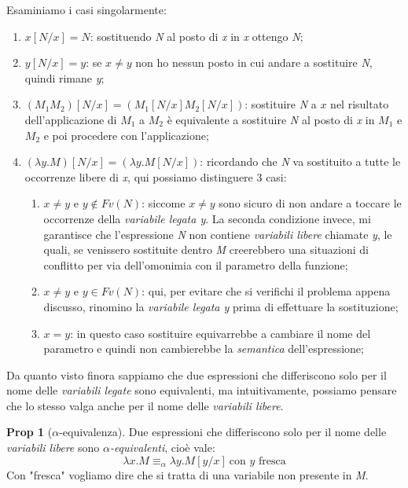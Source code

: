 \documentclass[12pt, a4paper]{report}
\theoremstyle{definition}
\newtheorem{proposition}{Prop}[section]
\newcommand{\aeq}{\equiv_\alpha}
\begin{document}
Esaminiamo i casi singolarmente:
\begin{enumerate}[label=(\roman*)]
    \item \(x[N/x]=N\): sostituendo \emph{N} al posto di \emph{x} in \emph{x}
    ottengo \emph{N};
    \item \(y[N/x]=y\): se $x\neq y$ non ho nessun posto in cui andare a sostituire
    \emph{N}, quindi rimane \emph{y};
    \item \((M_1M_2)[N/x]=(M_1[N/x]M_2[N/x])\): sostituire \emph{N} a $x$ nel risultato
    dell'applicazione di $M_1$ a $M_2$ è equivalente a sostituire \emph{N} al
    posto di \emph{x} in $M_1$ e $M_2$ e poi procedere con l'applicazione;
    \item \((\lambda y.M)[N/x]=(\lambda y.M[N/x])\): ricordando che \emph{N} va
    sostituito a tutte le occorrenze libere di \emph{x}, qui possiamo distinguere
    3 casi:
    \begin{enumerate}
        \item \(x\neq y\) e \(y\notin Fv(N)\): siccome $x\neq y$ sono sicuro di
        non andare a toccare le occorrenze della \emph{variabile legata y}. La
        seconda condizione invece, mi garantisce che l'espressione \emph{N} non
        contiene \emph{variabili libere} chiamate \emph{y}, le quali, se venissero
        sostituite dentro \emph{M} creerebbero una situazioni di conflitto per
        via dell'omonimia con il parametro della funzione;
        \item \(x\neq y\) e \(y\in Fv(N)\): qui, per evitare che si verifichi il
        problema appena discusso, rinomino la \emph{variabile legata y} prima di
        effettuare la sostituzione;
        \item \(x=y\): in questo caso sostituire equivarrebbe a cambiare il nome
        del parametro e quindi non cambierebbe la \emph{semantica} dell'espressione;
    \end{enumerate}
\end{enumerate}

Da quanto visto finora sappiamo che due espressioni che differiscono solo per il
nome delle \emph{variabili legate} sono equivalenti, ma intuitivamente, possiamo
pensare che lo stesso valga anche per il nome delle \emph{variabili libere}.

\begin{proposition}[$\alpha$-equivalenza]
    Due espressioni che differiscono solo per il nome delle \emph{variabili libere}
    sono \emph{$\alpha$-equivalenti}, cioè vale:
    \[\lambda x.M\aeq\lambda y.M[y/x]\ \text{con $y$ fresca}\]
    Con "fresca" vogliamo dire che si tratta di una variabile non presente in
    \emph{M}.
\end{proposition}
\end{document}
